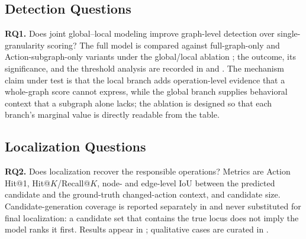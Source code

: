 \begin{table}[t]
\caption{Main graph-level detection comparison. Groups are separated by input paradigm; cells are completed from the experiments.}
\label{tab:main}
\end{table}

\subsection{Detection Questions}
\textbf{RQ1.} Does joint global--local modeling improve graph-level detection over single-granularity scoring? The full model is compared against full-graph-only and Action-subgraph-only variants under the global/local ablation ; the outcome, its significance, and the threshold analysis are recorded in  and . The mechanism claim under test is that the local branch adds operation-level evidence that a whole-graph score cannot express, while the global branch supplies behavioral context that a subgraph alone lacks; the ablation is designed so that each branch's marginal value is directly readable from the table.

\subsection{Localization Questions}
\textbf{RQ2.} Does localization recover the responsible operations? Metrics are Action Hit@1, Hit@$K$/Recall@$K$, node- and edge-level IoU between the predicted candidate and the ground-truth changed-action context, and candidate size. Candidate-generation coverage is reported separately in  and never substituted for final localization: a candidate set that contains the true locus does not imply the model ranks it first. Results appear in ; qualitative cases are curated in .


